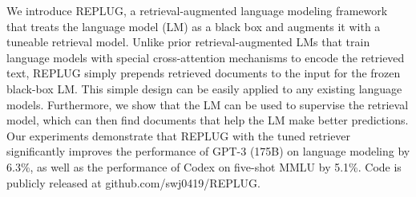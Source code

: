 We introduce REPLUG, a retrieval-augmented language modeling framework that treats the language model (LM) as a black box and augments it with a tuneable retrieval model. Unlike prior retrieval-augmented LMs that train language models with special cross-attention mechanisms to encode the retrieved text, REPLUG simply prepends retrieved documents to the input for the frozen black-box LM. This simple design can be easily applied to any existing language models. Furthermore, we show that the LM can be used to supervise the retrieval model, which can then find documents that help the LM make better predictions. Our experiments demonstrate that REPLUG with the tuned retriever significantly improves the performance of GPT-3 (175B) on language modeling by 6.3\%, as well as the performance of Codex on five-shot MMLU by 5.1\%. Code is publicly released at github.com/swj0419/REPLUG.